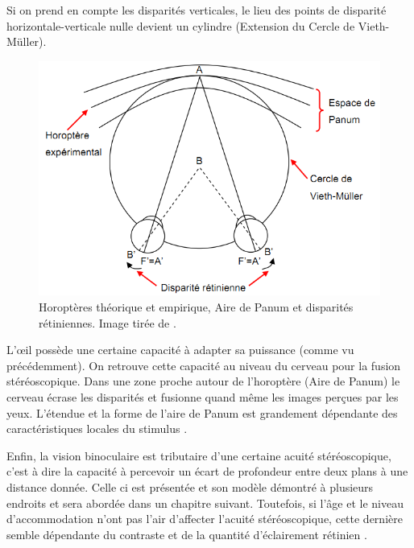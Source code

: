 	\par Si on prend en compte les disparités verticales, le lieu des points de disparité horizontale-verticale nulle devient un cylindre (Extension du Cercle de Vieth-Müller).
	
	\begin{figure}
		\centering
		\includegraphics[scale=.55]{Figures/HoropterePanum}
		\caption{Horoptères théorique et empirique, Aire de Panum et disparités rétiniennes. Image tirée de \citep{neveu_impact_2012}.}
		\label{fig:horoptere_panum}
	\end{figure}
	
	\par L'œil possède une certaine capacité à adapter sa puissance (comme vu précédemment). On retrouve cette capacité au niveau du cerveau pour la fusion stéréoscopique. Dans une zone proche autour de l'horoptère (Aire de Panum) le cerveau écrase les disparités et fusionne quand même les images perçues par les yeux. L'étendue et la forme de l'aire de Panum est grandement dépendante des caractéristiques locales du stimulus \citep{devisme_optimisation_2004}.
	
	\par Enfin, la vision binoculaire est tributaire d'une certaine acuité stéréoscopique, c'est à dire la capacité à percevoir un écart de profondeur entre deux plans à une distance donnée. Celle ci est présentée et son modèle démontré à plusieurs endroits \citep{fuchs_traite_2003, gross_human_2008} et sera abordée dans un chapitre suivant. Toutefois, si l'âge et le niveau d'accommodation n'ont pas l'air d'affecter l'acuité stéréoscopique, cette dernière semble dépendante du contraste et de la quantité d'éclairement rétinien \citep{devisme_optimisation_2004}.
	
